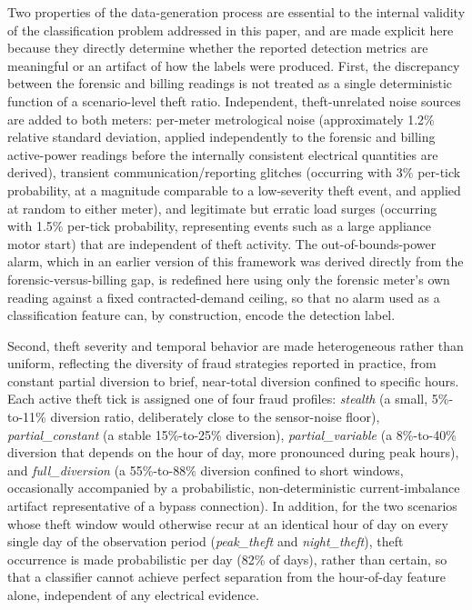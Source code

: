 \documentclass{ieeeaccess}
\begin{document}
Two properties of the data-generation process are essential to the internal validity of the classification problem addressed in this paper, and are made explicit here because they directly determine whether the reported detection metrics are meaningful or an artifact of how the labels were produced. First, the discrepancy between the forensic and billing readings is not treated as a single deterministic function of a scenario-level theft ratio. Independent, theft-unrelated noise sources are added to both meters: per-meter metrological noise (approximately 1.2\% relative standard deviation, applied independently to the forensic and billing active-power readings before the internally consistent electrical quantities are derived), transient communication/reporting glitches (occurring with 3\% per-tick probability, at a magnitude comparable to a low-severity theft event, and applied at random to either meter), and legitimate but erratic load surges (occurring with 1.5\% per-tick probability, representing events such as a large appliance motor start) that are independent of theft activity. The out-of-bounds-power alarm, which in an earlier version of this framework was derived directly from the forensic-versus-billing gap, is redefined here using only the forensic meter's own reading against a fixed contracted-demand ceiling, so that no alarm used as a classification feature can, by construction, encode the detection label.

Second, theft severity and temporal behavior are made heterogeneous rather than uniform, reflecting the diversity of fraud strategies reported in practice, from constant partial diversion to brief, near-total diversion confined to specific hours. Each active theft tick is assigned one of four fraud profiles: \textit{stealth} (a small, 5\%-to-11\% diversion ratio, deliberately close to the sensor-noise floor), \textit{partial\_constant} (a stable 15\%-to-25\% diversion), \textit{partial\_variable} (a 8\%-to-40\% diversion that depends on the hour of day, more pronounced during peak hours), and \textit{full\_diversion} (a 55\%-to-88\% diversion confined to short windows, occasionally accompanied by a probabilistic, non-deterministic current-imbalance artifact representative of a bypass connection). In addition, for the two scenarios whose theft window would otherwise recur at an identical hour of day on every single day of the observation period (\textit{peak\_theft} and \textit{night\_theft}), theft occurrence is made probabilistic per day (82\% of days), rather than certain, so that a classifier cannot achieve perfect separation from the hour-of-day feature alone, independent of any electrical evidence.
\end{document}
